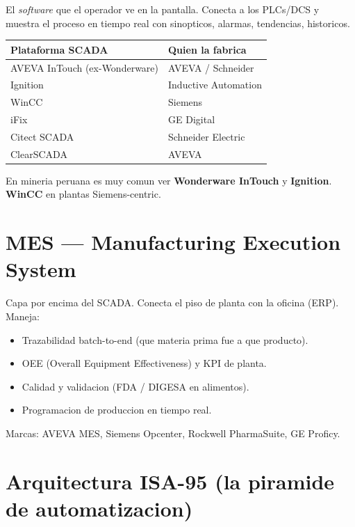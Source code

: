 \documentclass[11pt,a4paper,oneside]{report}
\begin{document}
El \emph{software} que el operador ve en la pantalla. Conecta a los PLCs/DCS
y muestra el proceso en tiempo real con sinopticos, alarmas, tendencias,
historicos.

\begin{center}
\begin{tabular}{ll}
\toprule
\textbf{Plataforma SCADA} & \textbf{Quien la fabrica} \\
\midrule
AVEVA InTouch (ex-Wonderware) & AVEVA / Schneider \\
Ignition                       & Inductive Automation \\
WinCC                         & Siemens \\
iFix                          & GE Digital \\
Citect SCADA                  & Schneider Electric \\
ClearSCADA                    & AVEVA \\
\bottomrule
\end{tabular}
\end{center}

En mineria peruana es muy comun ver \textbf{Wonderware InTouch} y
\textbf{Ignition}. \textbf{WinCC} en plantas Siemens-centric.

\section{MES --- Manufacturing Execution System}

Capa por encima del SCADA. Conecta el piso de planta con la oficina
(ERP). Maneja:

\begin{itemize}[leftmargin=2em]
  \item Trazabilidad batch-to-end (que materia prima fue a que producto).
  \item OEE (Overall Equipment Effectiveness) y KPI de planta.
  \item Calidad y validacion (FDA / DIGESA en alimentos).
  \item Programacion de produccion en tiempo real.
\end{itemize}

Marcas: AVEVA MES, Siemens Opcenter, Rockwell PharmaSuite, GE Proficy.

\section{Arquitectura ISA-95 (la piramide de automatizacion)}
\end{document}
